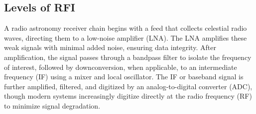 \subsection{Levels of RFI}
\label{subsection:hardware:introduction: levels}
A radio astronomy receiver chain begins with a feed that collects celestial radio waves, directing them to a low-noise amplifier (LNA). The LNA amplifies these weak signals with minimal added noise, ensuring data integrity. After amplification, the signal passes through a bandpass filter to isolate the frequency of interest, followed by downconversion, when applicable, to an intermediate frequency (IF) using a mixer and local oscillator. The IF or baseband signal is further amplified, filtered, and digitized by an analog-to-digital converter (ADC), though modern systems increasingly digitize directly at the radio frequency (RF) to minimize signal degradation.

